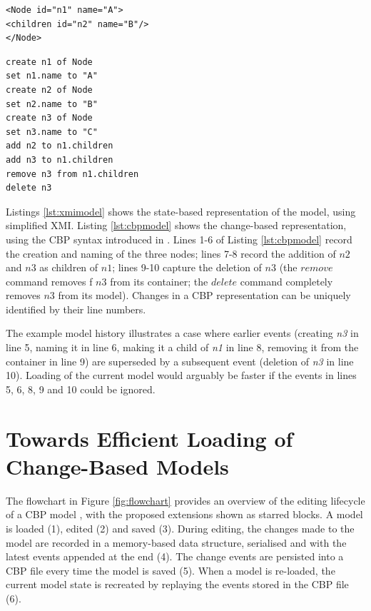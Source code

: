 \documentclass{llncs}
\begin{document}
    \vspace{-10pt}
\begin{minipage}[t]{0.5\linewidth}
\begin{lstlisting}[style=xmi,caption={State-based tree model.},label=lst:xmimodel]
<Node id="n1" name="A">
<children id="n2" name="B"/>
</Node>
\end{lstlisting}
\end{minipage}
\hfill
\begin{minipage}[t]{0.5\linewidth}
\begin{lstlisting}[style=eol,caption={Change-based tree model.},label=lst:cbpmodel]
create n1 of Node
set n1.name to "A"  
create n2 of Node
set n2.name to "B"  
create n3 of Node
set n3.name to "C"  
add n2 to n1.children   
add n3 to n1.children
remove n3 from n1.children   
delete n3
\end{lstlisting}
\end{minipage}

    Listings \ref{lst:xmimodel} shows the state-based representation of the model, using simplified XMI.  Listing \ref{lst:cbpmodel} shows the change-based representation, using the CBP syntax introduced in \cite{yohannis2017turning}. Lines 1-6 of Listing \ref{lst:cbpmodel} record the creation and naming of the three nodes; lines 7-8 record the addition of $n2$ and $n3$ as children of $n1$; lines 9-10 capture the deletion of $n3$ (the $remove$ command removes f $n3$ from its container; the $delete$ command completely removes $n3$ from its model). Changes in a CBP representation can be uniquely identified by their line numbers.
    
    The example model history illustrates a case where  earlier events (creating \emph{n3} in line 5, naming it in line 6, making it a child of \emph{n1} in line 8, removing it from the container in line 9) are superseded by a subsequent event (deletion of \emph{n3} in line 10).  Loading of the current model would arguably be faster if the events in lines 5, 6, 8, 9 and 10 could be ignored.
    
    \vspace{-10pt}
    \section{Towards Efficient Loading of Change-Based Models}
    \label{sec:loading_time_optimisation}
    
    \vspace{-10pt}
    The flowchart in Figure \ref{fig:flowchart} provides an overview of the editing lifecycle of a CBP model \cite{yohannis2017turning}, with the proposed extensions shown as starred blocks. A model is loaded (1), edited (2) and saved (3).  During editing, the changes made to the model are recorded in a memory-based data structure, serialised and with the latest events appended at the end (4). The change events are persisted into a CBP file every time the model is saved (5). When a model is re-loaded, the current model state is recreated by replaying the events stored in the CBP file (6).
    
\end{document}

